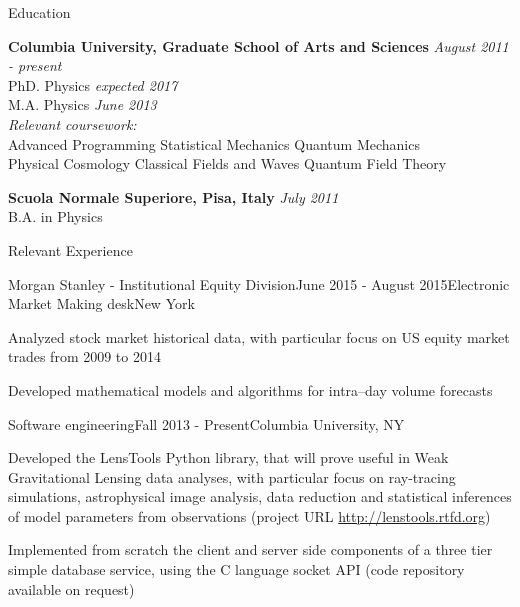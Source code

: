 \documentclass{resume} %
\begin{document}

\begin{rSection}{Education}

{\bf Columbia University, Graduate School of Arts and Sciences} \hfill {\em August 2011 - present} \\ 
PhD. Physics \hfill {\em expected 2017} \\ M.A. Physics \hfill {\em June 2013} 
\\
\textit{Relevant coursework:} \\
Advanced Programming \hspace{4pt} Statistical Mechanics \hspace{4pt} Quantum Mechanics\\
Physical Cosmology \hspace{4pt} Classical Fields and Waves \hspace{4pt} Quantum Field Theory

{\bf Scuola Normale Superiore, Pisa, Italy} \hfill {\em July 2011} \\ 
B.A. in Physics \\

\end{rSection}


\begin{rSection}{Relevant Experience}

\begin{rSubsection}{Morgan Stanley - Institutional Equity Division}{June 2015 - August 2015}{Electronic Market Making desk}{New York}
\item Analyzed stock market historical data, with particular focus on US equity market trades from 2009 to 2014
\item Developed mathematical models and algorithms for intra--day volume forecasts 
\end{rSubsection}

\begin{rSubsection}{Software engineering}{Fall 2013 - Present}{}{Columbia University, NY}
\item Developed the LensTools Python library, that will prove useful in Weak Gravitational Lensing data analyses, with particular focus on ray-tracing simulations, astrophysical image analysis, data reduction and statistical inferences of model parameters from observations (project URL \url{http://lenstools.rtfd.org})
\item Implemented from scratch the client and server side components of a three tier simple database service, using the C language socket API (code repository available on request)
\end{rSubsection}

\end{rSection}
\end{document}

